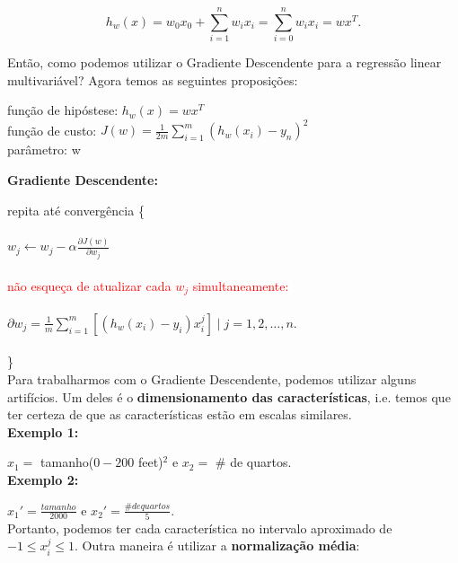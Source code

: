 \begin{equation}
\label{e.multi_optimization2}
h_w(x) = w_0x_0 + \sum\limits_{i = 1}^n w_ix_i = \sum\limits_{i = 0}^n w_ix_i = wx^T.
\end{equation}

Então, como podemos utilizar o Gradiente Descendente para a regressão linear multivariável? Agora temos as seguintes proposições:

\begin{center}
função de hipóstese: $h_w(x) = wx^T$\\
função de custo: $J(w) = \frac{1}{2m} \sum\limits_{i=1}^m (h_w(x_i)-y_n)^2$\\
parâmetro: w	
\end{center}

\textbf{Gradiente Descendente:}

 repita até convergência \{ \\ \\
 \hspace*{25pt} $w_j \leftarrow w_j - \alpha \frac{\partial J(w)}{\partial w_j}$\\~\\
 \hspace*{25pt} \textcolor{red}{não esqueça de atualizar cada $w_j$ simultaneamente:}\\~\\
 \hspace*{25pt} $\partial w_j = \frac{1}{m} \sum_{i=1}^{m}[(h_w(x_i) - y_i)x_i^j] \mid j = 1, 2, \dots, n.$ \\ \\
 \hspace*{15pt} \} \\
 
Para trabalharmos com o Gradiente Descendente, podemos utilizar alguns artifícios. Um deles é o \textbf{dimensionamento das características}, i.e. temos que ter certeza de que as características estão em escalas similares.\\

\textbf{Exemplo 1:}

$x_1 =$ tamanho($0 - 200$ feet)$^2$ e $x_2 =$ \# de quartos. \\

\textbf{Exemplo 2:}

$x_1' = \frac{tamanho}{2000}$ e $x_2' = \frac{\# de quartos}{5}$. \\

Portanto, podemos ter cada característica no intervalo aproximado de $-1 \leq x_i^j \leq 1$. Outra maneira é utilizar a \textbf{normalização média}:

